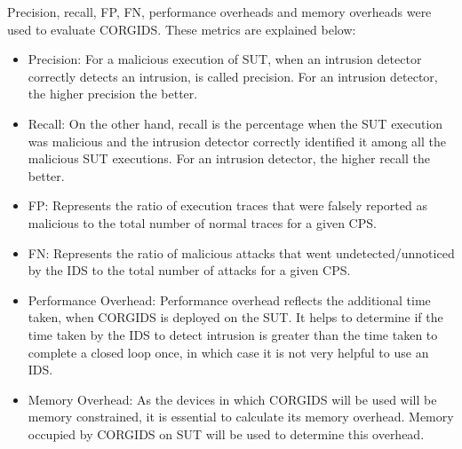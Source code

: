 Precision, recall, \ac{FP}, \ac{FN}, performance overheads and memory overheads were used to evaluate \ac{CORGIDS}. These metrics are explained below:

\begin{itemize}
\item Precision: For a malicious execution of \ac{SUT}, when an intrusion detector correctly detects an intrusion, is called precision. For an intrusion detector, the higher precision the better.
\item Recall: On the other hand, recall is the percentage when the \ac{SUT} execution was malicious and the intrusion detector correctly identified it among all the malicious \ac{SUT} executions. For an intrusion detector, the higher recall the better.
\item \acf{FP}: Represents the ratio of execution traces that were falsely reported as malicious to the total number of normal traces for a given \ac{CPS}.
\item \acf{FN}: Represents the ratio of malicious attacks that went undetected/unnoticed by the IDS to the total number of attacks for a given \ac{CPS}.
\item Performance Overhead: Performance overhead reflects the additional time taken, when \ac{CORGIDS} is deployed on the \ac{SUT}. It helps to determine if the time taken by the \ac{IDS} to detect intrusion is greater than the time taken to complete a closed loop once, in which case it is not very helpful to use an \ac{IDS}.
\item Memory Overhead: As the devices in which \ac{CORGIDS} will be used will be memory constrained, it is essential to calculate its memory overhead. Memory occupied by \ac{CORGIDS} on \ac{SUT} will be used to determine this overhead.
\end{itemize}


\begin{table}
\centering
  \caption{False Positive and False Negative obtained for CORGIDS on the two test-beds}
  \label{tab:results}
\end{table}


